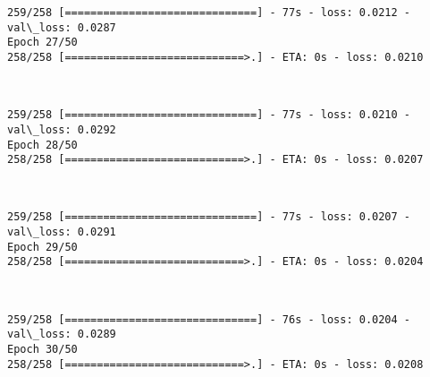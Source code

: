 \documentclass[11pt]{article}
\begin{document}
    \begin{Verbatim}[commandchars=\\\{\}]
259/258 [==============================] - 77s - loss: 0.0212 - val\_loss: 0.0287
Epoch 27/50
258/258 [============================>.] - ETA: 0s - loss: 0.0210
    \end{Verbatim}

    \begin{center}
    \end{center}
    { \hspace*{\fill} \\}
    
    \begin{Verbatim}[commandchars=\\\{\}]
259/258 [==============================] - 77s - loss: 0.0210 - val\_loss: 0.0292
Epoch 28/50
258/258 [============================>.] - ETA: 0s - loss: 0.0207
    \end{Verbatim}

    \begin{center}
    \end{center}
    { \hspace*{\fill} \\}
    
    \begin{Verbatim}[commandchars=\\\{\}]
259/258 [==============================] - 77s - loss: 0.0207 - val\_loss: 0.0291
Epoch 29/50
258/258 [============================>.] - ETA: 0s - loss: 0.0204
    \end{Verbatim}

    \begin{center}
    \end{center}
    { \hspace*{\fill} \\}
    
    \begin{Verbatim}[commandchars=\\\{\}]
259/258 [==============================] - 76s - loss: 0.0204 - val\_loss: 0.0289
Epoch 30/50
258/258 [============================>.] - ETA: 0s - loss: 0.0208
    \end{Verbatim}

    \begin{center}
    \end{center}
    { \hspace*{\fill} \\}
    
\end{document}
